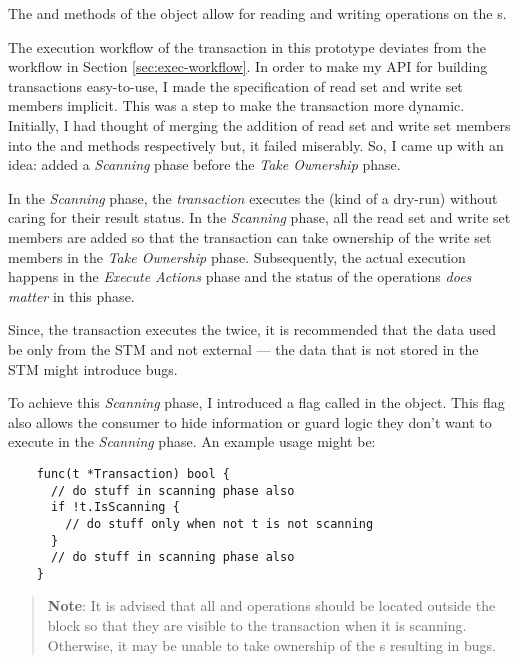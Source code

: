 \documentclass[../main]{subfiles}
\begin{document}
  \par
  The  and  methods of the  object allow for reading and writing operations on the s. \par

  The execution workflow of the transaction in this prototype deviates from the workflow in Section \ref{sec:exec-workflow}. In order to make my API for building transactions easy-to-use, I made the specification of read set and write set members implicit. This was a step to make the transaction more dynamic. Initially, I had thought of merging the addition of read set and write set members into the  and  methods respectively but, it failed miserably. So, I came up with an idea: added a {\em Scanning} phase before the {\em Take Ownership} phase. \par

  In the {\em Scanning} phase, the {\em transaction} executes the  (kind of a dry-run) without caring for their result status. In the {\em Scanning} phase, all the read set and write set members are added so that the transaction can take ownership of the write set members in the {\em Take Ownership} phase. Subsequently, the actual execution happens in the {\em Execute Actions} phase and the status of the operations {\em does matter} in this phase. \par

  Since, the transaction executes the  twice, it is recommended that the data used be only from the STM and not external --- the data that is not stored in the STM might introduce bugs. \par

  To achieve this {\em Scanning} phase, I introduced a flag called  in the  object. This flag also allows the consumer to hide information or guard logic they don't want to execute in the {\em Scanning} phase. An example usage might be:

  \begin{lstlisting}
    func(t *Transaction) bool {
      // do stuff in scanning phase also
      if !t.IsScanning {
        // do stuff only when not t is not scanning
      }
      // do stuff in scanning phase also
    }
  \end{lstlisting}

  \begin{verse}
    {\bf Note}: It is advised that all  and  operations should be located outside the  block so that they are visible to the transaction when it is scanning. Otherwise, it may be unable to take ownership of the s resulting in bugs.
  \end{verse}
\end{document}
